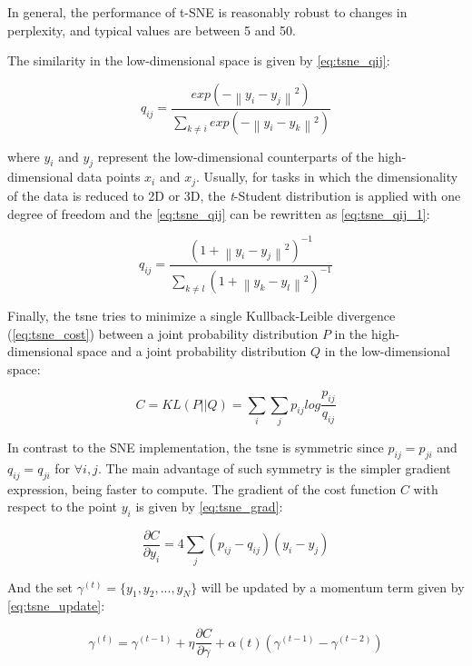 In general, the performance of t-SNE is reasonably robust to changes in perplexity, and typical values are between 5 and 50.

The similarity in the low-dimensional space is given by \autoref{eq:tsne_qij}:

\begin{equation}
\label{eq:tsne_qij}
q_{ij} = \frac{exp(-\left\| y_i - y_j \right\|^2)}{\sum_{k \neq i} exp(-\left\| y_i - y_k \right\|^2)}
\end{equation}

\noindent
where $y_i$ and $y_j$ represent the low-dimensional counterparts of the
high-dimensional data points $x_i$ and $x_j$. Usually, for tasks in which the dimensionality of the data is reduced to 2D or 3D, the \textit{t}-Student distribution is applied with one degree of freedom and the \autoref{eq:tsne_qij} can be rewritten as \autoref{eq:tsne_qij_1}:

\begin{equation}
\label{eq:tsne_qij_1}
q_{ij} = \frac{(1 +\left\| y_i - y_j \right\|^2)^{-1}}{\sum_{k \neq l} (1 +\left\| y_k - y_l \right\|^2)^{-1}}
\end{equation}

Finally, the \acs{tsne} tries to minimize a single Kullback-Leible divergence (\autoref{eq:tsne_cost}) between a joint probability distribution $P$ in the high-dimensional space and a joint probability distribution $Q$ in the low-dimensional space:

\begin{equation}
\label{eq:tsne_cost}
C = KL(P||Q) = \sum_i\sum_j p_{ij} log \frac{p_{ij}}{q_{ij}}
\end{equation}

In contrast to the SNE implementation, the \acs{tsne} is symmetric since $p_{ij} = p_{ji}$ and $q_{ij} = q_{ji}$ for $\forall i,j$. The main advantage of such symmetry is the simpler gradient expression, being faster to compute. The gradient of the cost function $C$ with respect to the point $y_i$ is given by \autoref{eq:tsne_grad}:

\begin{equation}
\label{eq:tsne_grad}
\frac{\partial C}{\partial y_i} = 4 \sum_j (p_{ij} - q_{ij})(y_i - y_j)
\end{equation}

And the set $\gamma^{(t)} = \{y_1, y_2, ..., y_N\}$ will be updated by a momentum term given by \autoref{eq:tsne_update}:

\begin{equation}
\label{eq:tsne_update}
\gamma^{(t)} = \gamma^{(t-1)} + \eta\frac{\partial C}{\partial \gamma} + \alpha(t)(\gamma^{(t-1)} - \gamma^{(t-2)})
\end{equation}

